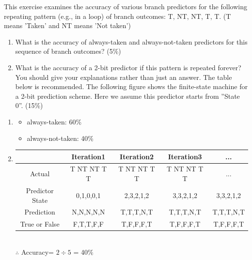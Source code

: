 \documentclass[12pt, a4paper]{article}
\begin{document}
\begin{q}{20}
    This exercise examines the accuracy of various branch predictors for the following repeating pattern (e.g., in a loop) of branch outcomes: T, NT, NT, T, T. (T means ’Taken’ and NT means ’Not taken’)
    \begin{enumerate}
        \item What is the accuracy of always-taken and always-not-taken predictors for this sequence of branch outcomes? (5\%)
        \item What is the accuracy of a 2-bit predictor if this pattern is repeated forever? You should give your explanations rather than just an answer. The table below is recommended. The following figure shows the finite-state machine for a 2-bit prediction scheme. Here we assume this predictor starts from ”State 0”. (15\%)
    \end{enumerate}
\end{q}
\begin{ans}
    \begin{enumerate}
        \item 
        \begin{itemize}
            \item always-taken: 60\%
            \item always-not-taken: 40\%
        \end{itemize}
        \item 
        \begin{tabular}{|c|c|c|c|c|}
            \hline
             & Iteration1 & Iteration2 & Iteration3 & ...\\
            \hline
            Actual & T NT NT T T & T NT NT T T & T NT NT T T&...\\
            \hline
            Predictor State &0,1,0,0,1&2,3,2,1,2&3,3,2,1,2&3,3,2,1,2\\
            \hline
            Prediction & N,N,N,N,N & T,T,T,N,T & T,T,T,N,T & T,T,T,N,T \\
            \hline
            True or False & F,T,T,F,F & T,F,F,F,T & T,F,F,F,T & T,F,F,F,T\\
            \hline
        \end{tabular}
        \\$\therefore$ Accuracy= $2\div5$ = 40\%
    \end{enumerate}
\end{ans}
\pagebreak
\end{document}
